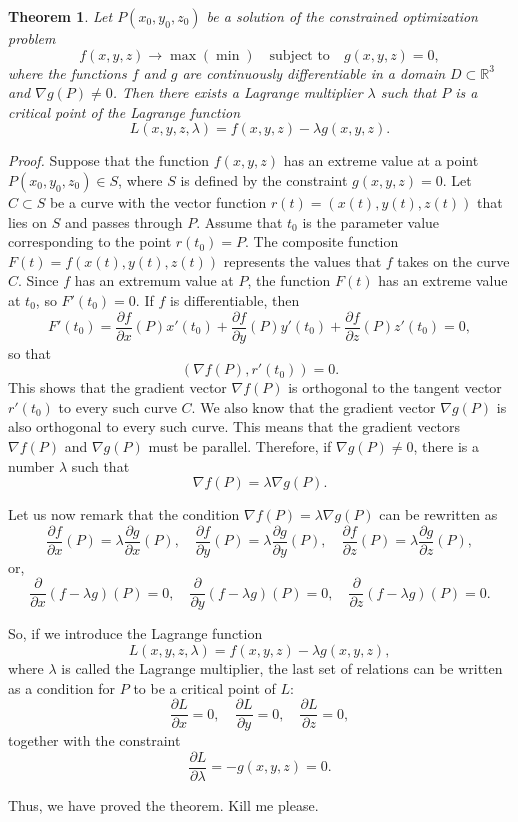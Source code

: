 \documentclass{article}
\newtheorem{theorem}{Theorem}
\begin{document}
\begin{theorem}
Let $P(x_0, y_0, z_0)$ be a solution of the constrained optimization problem
\[
f(x, y, z) \to \max (\min) \quad \text{subject to} \quad g(x, y, z) = 0,
\]
where the functions $f$ and $g$ are continuously differentiable in a domain $D \subset \mathbb{R}^3$ and $\nabla g(P) \neq 0$. Then there exists a Lagrange multiplier $\lambda$ such that $P$ is a critical point of the Lagrange function
\[
L(x, y, z, \lambda) = f(x, y, z) - \lambda g(x, y, z).
\]
\end{theorem}

\vspace{1em}

\textit{Proof.} Suppose that the function $f(x, y, z)$ has an extreme value at a point $P(x_0, y_0, z_0) \in S$, where $S$ is defined by the constraint $g(x, y, z) = 0$. Let $C \subset S$ be a curve with the vector function $r(t) = (x(t), y(t), z(t))$ that lies on $S$ and passes through $P$. Assume that $t_0$ is the parameter value corresponding to the point $r(t_0) = P$. The composite function $F(t) = f(x(t), y(t), z(t))$ represents the values that $f$ takes on the curve $C$. Since $f$ has an extremum value at $P$, the function $F(t)$ has an extreme value at $t_0$, so $F'(t_0) = 0$. If $f$ is differentiable, then
\[
F'(t_0) = \frac{\partial f}{\partial x}(P)x'(t_0) + \frac{\partial f}{\partial y}(P)y'(t_0) + \frac{\partial f}{\partial z}(P)z'(t_0) = 0,
\]
so that
\[
(\nabla f(P), r'(t_0)) = 0.
\]
This shows that the gradient vector $\nabla f(P)$ is orthogonal to the tangent vector $r'(t_0)$ to every such curve $C$. We also know that the gradient vector $\nabla g(P)$ is also orthogonal to every such curve. This means that the gradient vectors $\nabla f(P)$ and $\nabla g(P)$ must be parallel. Therefore, if $\nabla g(P) \neq 0$, there is a number $\lambda$ such that
\[
\nabla f(P) = \lambda \nabla g(P).
\]

Let us now remark that the condition $\nabla f(P) = \lambda \nabla g(P)$ can be rewritten as
\[
\frac{\partial f}{\partial x}(P) = \lambda \frac{\partial g}{\partial x}(P), \quad \frac{\partial f}{\partial y}(P) = \lambda \frac{\partial g}{\partial y}(P), \quad \frac{\partial f}{\partial z}(P) = \lambda \frac{\partial g}{\partial z}(P),
\]
or,
\[
\frac{\partial}{\partial x}(f - \lambda g)(P) = 0, \quad \frac{\partial}{\partial y}(f - \lambda g)(P) = 0, \quad \frac{\partial}{\partial z}(f - \lambda g)(P) = 0.
\]

So, if we introduce the Lagrange function
\[
L(x, y, z, \lambda) = f(x, y, z) - \lambda g(x, y, z),
\]
where $\lambda$ is called the Lagrange multiplier, the last set of relations can be written as a condition for $P$ to be a critical point of $L$:
\[
\frac{\partial L}{\partial x} = 0, \quad \frac{\partial L}{\partial y} = 0, \quad \frac{\partial L}{\partial z} = 0,
\]
together with the constraint
\[
\frac{\partial L}{\partial \lambda} = -g(x, y, z) = 0.
\]

Thus, we have proved the theorem. Kill me please.
\end{document}
